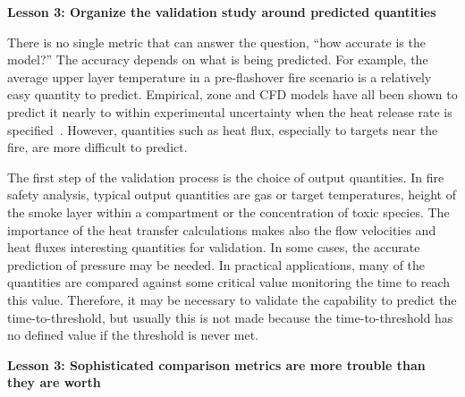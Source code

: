 \documentclass[fleqn,b5paper]{article}
\begin{document}
\vspace{\parskip}
{\bf Lesson 3: Organize the validation study around predicted quantities}

There is no single metric that can answer the question, ``how accurate is the model?'' The accuracy depends on what is being predicted. For example, the average upper layer temperature in a pre-flashover fire scenario is a relatively easy quantity to predict. Empirical, zone and CFD models have all been shown to predict it nearly to within experimental uncertainty when the heat release rate is specified~\cite{NUREG_1824}. However, quantities such as heat flux, especially to targets near the fire, are more difficult to predict.

The first step of the validation process is the choice of output quantities. In fire safety analysis, typical output quantities are gas or target temperatures, height of the smoke layer within a compartment or the concentration of toxic species. The importance of the heat transfer calculations makes also the flow velocities and heat fluxes interesting quantities for validation. In some cases, the accurate prediction of pressure may be needed. In practical applications, many of the quantities are compared against some critical value monitoring the time to reach this value. Therefore, it may be necessary to validate the capability to predict the time-to-threshold, but usually this is not made because the time-to-threshold has no defined value if the threshold is never met.

\vspace{\parskip}
{\bf Lesson 3: Sophisticated comparison metrics are more trouble than they are worth}
\end{document}
